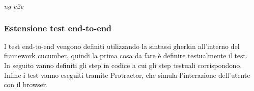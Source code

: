 \documentclass[../manuale-manutentore.tex]{subfiles}
\begin{document}
\begin{center}
  \textit{ng e2e}
\end{center}
\par\bigskip

\subsubsection{Estensione test end-to-end}%
\label{subs:estensione_test_end_to_end}
I test end-to-end vengono definiti utilizzando la sintassi gherkin all'interno del framework cucumber, quindi la prima cosa da fare è definire testualmente il test.
In seguito vanno definiti gli step in codice a cui gli step testuali corrispondono.
Infine i test vanno eseguiti tramite Protractor, che simula l'interazione dell'utente con il browser.

\end{document}
